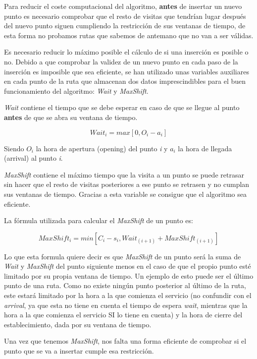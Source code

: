 Para reducir el coste computacional del algoritmo, \textbf{antes} de insertar un nuevo punto es necesario comprobar que el resto de visitas que tendrían lugar después del nuevo punto siguen cumpliendo la restricción de sus ventanas de tiempo, de esta forma no probamos rutas que sabemos de antemano que no van a ser válidas.

Es necesario reducir lo máximo posible el cálculo de si una inserción es posible o no. Debido a que comprobar la validez de un nuevo punto en cada paso de la inserción es imposible que sea eficiente, se han utilizado unas variables auxiliares en cada punto de la ruta que almacenan dos datos imprescindibles para el buen funcionamiento del algoritmo: \textit{Wait} y \textit{MaxShift}.

\textit{Wait} contiene el tiempo que se debe esperar en caso de que se llegue al punto \textbf{antes} de que se abra su ventana de tiempo.

\[Wait_i = max[0, O_i - a_i]\]

Siendo $O_i$ la hora de apertura (opening) del punto \textit{i} y $a_i$ la hora de llegada (arrival) al punto \textit{i}.

\textit{MaxShift} contiene el máximo tiempo que la visita a un punto se puede retrasar sin hacer que el resto de visitas posteriores a ese punto se retrasen y no cumplan sus ventanas de tiempo. Gracias a esta variable se consigue que el algoritmo sea eficiente.

La fórmula utilizada para calcular el \textit{MaxShift} de un punto es:

\[MaxShift_i = min[C_i - s_i, Wait_(i+1) + MaxShift_(i+1)]\]

Lo que esta formula quiere decir es que \textit{MaxShift} de un punto será la suma de \textit{Wait} y \textit{MaxShift} del punto siguiente menos en el caso de que el propio punto esté limitado por su propia ventana de tiempo. Un ejemplo de esto puede ser el último punto de una ruta. Como no existe ningún punto posterior al último de la ruta, este estará limitado por la hora a la que comienza el servicio (no confundir con el \textit{arrival}, ya que esta no tiene en cuenta el tiempo de espera \textit{wait}, mientras que la hora a la que comienza el servicio SI lo tiene en cuenta) y la hora de cierre del establecimiento, dada por su ventana de tiempo.

Una vez que tenemos \textit{MaxShift}, nos falta una forma eficiente de comprobar si el punto que se va a insertar cumple esa restricción.

